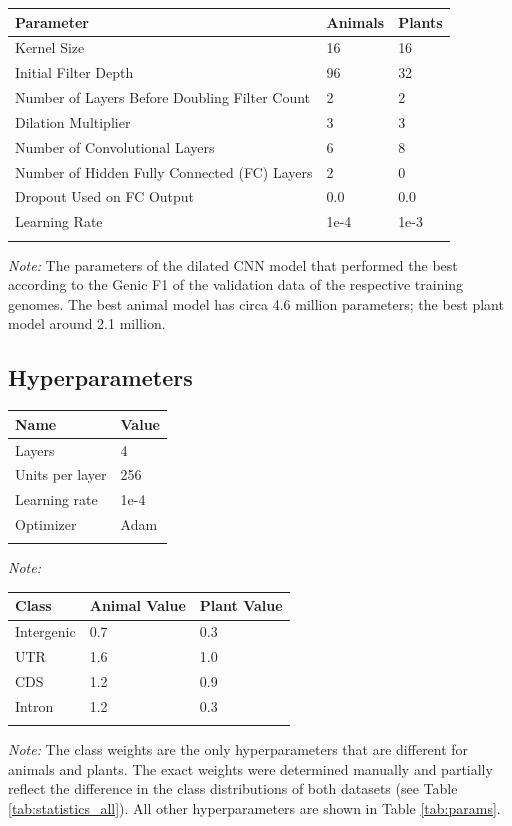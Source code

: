 \documentclass{bioinfo}
\begin{document}
\begin{table}[!t]
 {
\begin{tabular}{@{}lll@{}}
\toprule Parameter & Animals & Plants\\
\midrule
Kernel Size & 16 & 16\\
Initial Filter Depth & 96 & 32\\
Number of Layers Before Doubling Filter Count & 2 & 2\\
Dilation Multiplier & 3 & 3\\
Number of Convolutional Layers & 6 & 8\\
Number of Hidden Fully Connected (FC) Layers & 2 & 0\\
Dropout Used on FC Output & 0.0 & 0.0\\
Learning Rate & 1e-4 & 1e-3\\
\botrule
\end{tabular}}{{\it Note:} The parameters of the dilated CNN model that performed the best according to the Genic F1 of the validation data of the respective training genomes. The best animal model has circa 4.6 million parameters; the best plant model around 2.1 million.}
\end{table}


\subsection{Hyperparameters}

\begin{table}[!t]
 {
\begin{tabular}{@{}ll@{}}
\toprule Name & Value \\
\midrule
Layers & 4\\
Units per layer & 256\\
Learning rate & 1e-4\\
Optimizer & Adam\\
\botrule
\end{tabular}}{{\it Note:} }
\end{table}

\begin{table}[!t]
 {
\begin{tabular}{@{}lll@{}}
\toprule Class & Animal Value & Plant Value \\
\midrule
Intergenic & 0.7 & 0.3 \\
UTR & 1.6 & 1.0 \\
CDS & 1.2 & 0.9 \\
Intron & 1.2 & 0.3 \\
\botrule
\end{tabular}}{{\it Note:} The class weights are the only hyperparameters that are different for animals and plants. The exact weights were determined manually and partially reflect the difference in the class distributions of both datasets (see Table \ref{tab:statistics_all}). All other hyperparameters are shown in Table \ref{tab:params}.}
\end{table}
\end{document}
